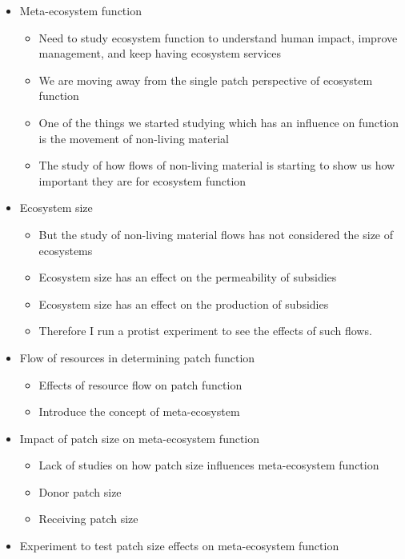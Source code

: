 \documentclass[
]{article}
\begin{document}
\begin{itemize}
\item
  Meta-ecosystem function

  \begin{itemize}
  \item
    Need to study ecosystem function to understand human impact, improve
    management, and keep having ecosystem services
  \item
    We are moving away from the single patch perspective of ecosystem
    function
  \item
    One of the things we started studying which has an influence on
    function is the movement of non-living material
  \item
    The study of how flows of non-living material is starting to show us
    how important they are for ecosystem function
  \end{itemize}
\item
  Ecosystem size

  \begin{itemize}
  \item
    But the study of non-living material flows has not considered the
    size of ecosystems
  \item
    Ecosystem size has an effect on the permeability of subsidies
  \item
    Ecosystem size has an effect on the production of subsidies
  \item
    Therefore I run a protist experiment to see the effects of such
    flows.
  \end{itemize}
\item
  Flow of resources in determining patch function

  \begin{itemize}
  \item
    Effects of resource flow on patch function
  \item
    Introduce the concept of meta-ecosystem
  \end{itemize}
\item
  Impact of patch size on meta-ecosystem function

  \begin{itemize}
  \item
    Lack of studies on how patch size influences meta-ecosystem function
  \item
    Donor patch size
  \item
    Receiving patch size
  \end{itemize}
\item
  Experiment to test patch size effects on meta-ecosystem function


\end{itemize}
\end{document}

